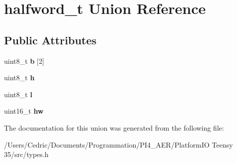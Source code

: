 \hypertarget{unionhalfword__t}{}\section{halfword\+\_\+t Union Reference}
\label{unionhalfword__t}
\subsection*{Public Attributes}
\begin{DoxyCompactItemize}
\item 
\mbox{\label{unionhalfword__t_a416701b2bcb202c1e9d11560aed969c0}} 
uint8\+\_\+t {\bfseries b} \mbox{[}2\mbox{]}
\item 
\mbox{\label{unionhalfword__t_a08a6dcef0b45a4ca9b7114197a43d9fc}} 
uint8\+\_\+t {\bfseries h}
\item 
\mbox{\label{unionhalfword__t_aba015a3f87db67d42431f67836f4f1ee}} 
uint8\+\_\+t {\bfseries l}
\item 
\mbox{\label{unionhalfword__t_a58f4fb874c13243f27b33ab7298febb3}} 
uint16\+\_\+t {\bfseries hw}
\end{DoxyCompactItemize}


The documentation for this union was generated from the following file\+:\begin{DoxyCompactItemize}
\item 
/\+Users/\+Cedric/\+Documents/\+Programmation/\+P\+I4\+\_\+\+A\+E\+R/\+Platform\+I\+O Teensy 35/src/types.\+h\end{DoxyCompactItemize}
